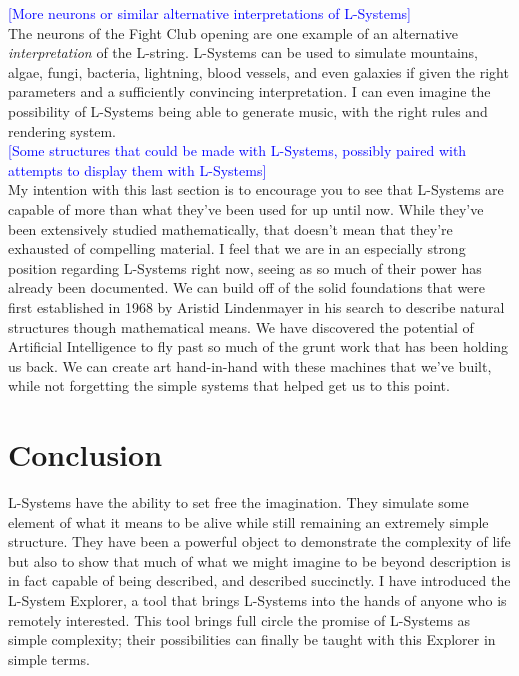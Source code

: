 \documentclass[12pt,twoside]{reedthesis}
\begin{document}
	\textcolor{blue}{[More neurons or similar alternative interpretations of L-Systems]}\\
	
	The neurons of the Fight Club opening are one example of an alternative \textit{interpretation} of the L-string. L-Systems can be used to simulate mountains, algae, fungi, bacteria, lightning, blood vessels, and even galaxies if given the right parameters and a sufficiently convincing interpretation. I can even imagine the possibility of L-Systems being able to generate music, with the right rules and rendering system.\\
	
	\textcolor{blue}{[Some structures that could be made with L-Systems, possibly paired with attempts to display them with L-Systems]}\\
	
	My intention with this last section is to encourage you to see that L-Systems are capable of more than what they've been used for up until now. While they've been extensively studied mathematically, that doesn't mean that they're exhausted of compelling material. I feel that we are in an especially strong position regarding L-Systems right now, seeing as so much of their power has already been documented. We can build off of the solid foundations that were first established in 1968 by Aristid Lindenmayer in his search to describe natural structures though mathematical means. We have discovered the potential of Artificial Intelligence to fly past so much of the grunt work that has been holding us back. We can create art hand-in-hand with these machines that we've built, while not forgetting the simple systems that helped get us to this point.
	
\chapter*{Conclusion}
	\setcounter{section}{0}
	
	L-Systems have the ability to set free the imagination. They simulate some element of what it means to be alive while still remaining an extremely simple structure. They have been a powerful object to demonstrate the complexity of life but also to show that much of what we might imagine to be beyond description is in fact capable of being described, and described succinctly. I have introduced the L-System Explorer, a tool that brings L-Systems into the hands of anyone who is remotely interested. This tool brings full circle the promise of L-Systems as simple complexity; their possibilities can finally be taught with this Explorer in simple terms.
	
\end{document}
